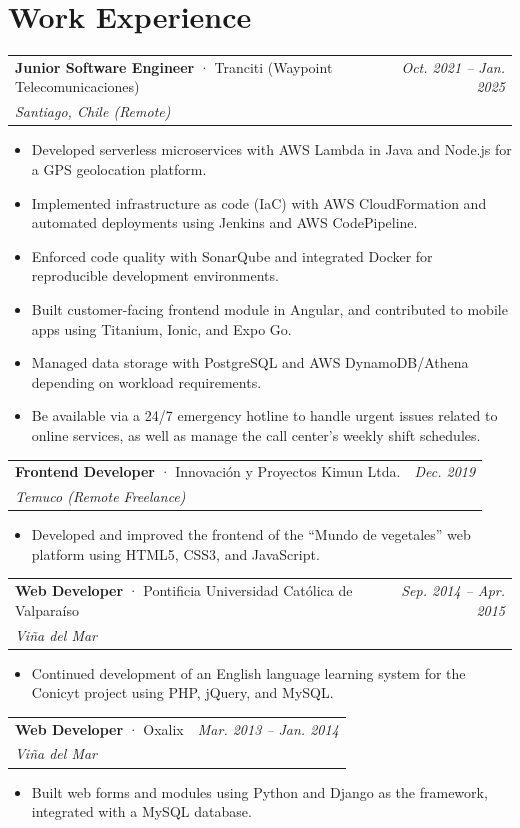 \documentclass[11pt, a4paper]{article}
\makeatletter
\newcommand{\entry}[4]{%
  \vspace{6pt}
  \begin{tabularx}{\textwidth}{@{}X r@{}}
    \textbf{#1} \textcolor{gris}{· #2} & \textcolor{grisClaro}{\small\textit{#4}} \\
    \textcolor{grisClaro}{\small\textit{#3}} & \\
  \end{tabularx}
  \vspace{2pt}
}
\makeatother
\begin{document}
\section{Work Experience}
 
\entry{Junior Software Engineer}{Tranciti (Waypoint Telecomunicaciones)}{Santiago, Chile (Remote)}{Oct. 2021 -- Jan. 2025}
\begin{itemize}
  \item Developed serverless microservices with AWS Lambda in Java and Node.js for a GPS geolocation platform.
  \item Implemented infrastructure as code (IaC) with AWS CloudFormation and automated deployments using Jenkins and AWS CodePipeline.
  \item Enforced code quality with SonarQube and integrated Docker for reproducible development environments.
  \item Built customer-facing frontend module in Angular, and contributed to mobile apps using Titanium, Ionic, and Expo Go.
  \item Managed data storage with PostgreSQL and AWS DynamoDB/Athena depending on workload requirements.
  \item Be available via a 24/7 emergency hotline to handle urgent issues related to online services, as well as manage the call center’s weekly shift schedules.
\end{itemize}
 
\entry{Frontend Developer}{Innovaci\'on y Proyectos Kimun Ltda.}{Temuco (Remote Freelance)}{Dec. 2019}
\begin{itemize}
  \item Developed and improved the frontend of the ``Mundo de vegetales'' web platform using HTML5, CSS3, and JavaScript.
\end{itemize}
 
\entry{Web Developer}{Pontificia Universidad Cat\'olica de Valpara\'iso}{Vi\~na del Mar}{Sep. 2014 -- Apr. 2015}
\begin{itemize}
  \item Continued development of an English language learning system for the Conicyt project using PHP, jQuery, and MySQL.
\end{itemize}
 
\entry{Web Developer}{Oxalix}{Vi\~na del Mar}{Mar. 2013 -- Jan. 2014}
\begin{itemize}
  \item Built web forms and modules using Python and Django as the framework, integrated with a MySQL database.
\end{itemize}
 
\end{document}
